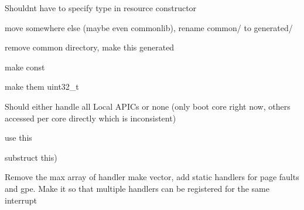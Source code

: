 \begin{DoxyRefList}
Shouldnt have to specify type in resource constructor  
\item[File \doxylink{logger_8h}{logger.h} ]\label{todo__todo000003}%
%
move somewhere else (maybe even commonlib), rename common/ to generated/  
\item[File \doxylink{logo_8h}{logo.h} ]\label{todo__todo000004}%
%
remove common directory, make this generated  
\item[Member \doxylink{classMaxOS_1_1common_1_1GraphicsContext_a5c545bb337e4870b51159e5b4812114c}{Max\+OS\+::common\+::Graphics\+Context\+::m\+\_\+colour\+\_\+pallet} \mbox{[}256\mbox{]}]\label{todo__todo000002}%
%
make const  
\item[Member \doxylink{classMaxOS_1_1common_1_1GraphicsContext_a0afe9ea3ec0cb8b264d5bc89ecafeabb}{Max\+OS\+::common\+::Graphics\+Context\+::put\+\_\+pixel} (uint32\+\_\+t x, uint32\+\_\+t y, uint32\+\_\+t colour)]\label{todo__todo000024}%
%
make them uint32\+\_\+t  
\item[Class \doxylink{classMaxOS_1_1hardwarecommunication_1_1AdvancedProgrammableInterruptController}{Max\+OS\+::hardwarecommunication\+::Advanced\+Programmable\+Interrupt\+Controller} ]\label{todo__todo000007}%
%
Should either handle all Local APICs or none (only boot core right now, others accessed per core directly which is inconsistent)  
\item[Member \doxylink{apic_8h_ae5961c617d1c9a84a7e86fbec0f59f44}{Max\+OS\+::hardwarecommunication\+::Delivery\+Mode} ]\label{todo__todo000006}%
%
use this  
\item[Member \doxylink{structMaxOS_1_1hardwarecommunication_1_1InterruptDescriptor_ae0d3e0ce9197a429c9a2a8e3eb8350ea}{Max\+OS\+::hardwarecommunication\+::Interrupt\+Descriptor\+::flags} ]\label{todo__todo000009}%
%
substruct this)  
\item[Class \doxylink{classMaxOS_1_1hardwarecommunication_1_1InterruptManager}{Max\+OS\+::hardwarecommunication\+::Interrupt\+Manager} ]\label{todo__todo000008}%
%
Remove the max array of handler make vector, add static handlers for page faults and gpe. Make it so that multiple handlers can be registered for the same interrupt 




\end{DoxyRefList}
